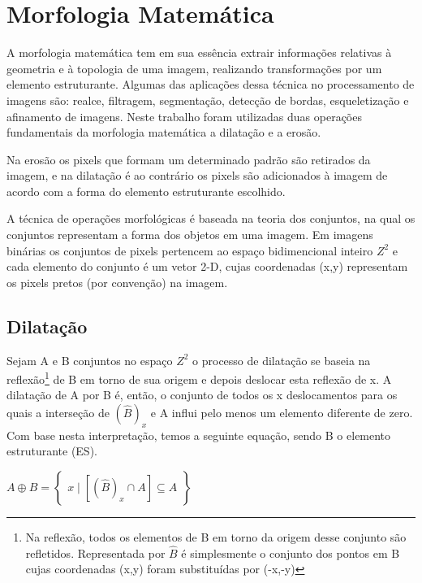 \section{Morfologia Matemática}
\label{sec:morfologia}
A morfologia matemática tem em sua essência extrair informações relativas à geometria e à topologia de uma imagem, realizando transformações por um elemento estruturante. Algumas das aplicações dessa técnica no processamento de imagens são:  realce, filtragem, segmentação, detecção de bordas, esqueletização e afinamento de imagens. \cite{pdi99} Neste trabalho foram utilizadas duas operações fundamentais da morfologia matemática a dilatação e a erosão.

Na erosão os pixels que formam um determinado padrão são retirados da imagem, e na dilatação é ao contrário os pixels são adicionados à imagem de acordo com a forma do elemento estruturante escolhido.\cite{digitalImgProcess2010}

A técnica de operações morfológicas é baseada na teoria dos conjuntos, na qual os conjuntos representam a forma dos objetos em uma imagem. Em imagens binárias os conjuntos de pixels pertencem ao espaço bidimencional inteiro $Z^{2}$ e cada elemento do conjunto é um vetor 2-D, cujas coordenadas (x,y) representam os pixels pretos (por convenção) na imagem.\cite{pdi99}

\subsection{Dilatação}
\label{subsec:morfologia-dila}

Sejam A e B conjuntos no espaço $Z^{2}$ o processo de dilatação se baseia na reflexão\footnote{ Na reflexão, todos os elementos de B em torno da origem desse conjunto são refletidos. Representada por $\hat{B}$ é simplesmente o conjunto dos pontos em B cujas coordenadas (x,y) foram substituídas por (-x,-y) }  de B em torno de sua origem e depois deslocar esta reflexão de x. A dilatação de A por B é, então, o conjunto de todos os x deslocamentos para os quais a interseção de $(\hat{B})_{x}$ e A influi pelo menos um elemento diferente de zero. Com base nesta interpretação, temos a seguinte equação, sendo B o elemento estruturante (ES).\cite{pdi99}

\begin{center}
    $A \oplus B = \begin{Bmatrix}
    x\mid \left [ (\hat{B})_{x}\cap A \right  ] \subseteq A 
    \end{Bmatrix}$
\end{center}

